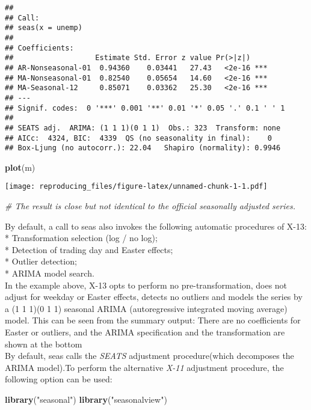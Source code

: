 \documentclass[]{article}
\newenvironment{Shaded}{\begin{snugshade}}{\end{snugshade}}
\newcommand{\CommentTok}[1]{\textcolor[rgb]{0.56,0.35,0.01}{\textit{#1}}}
\newcommand{\KeywordTok}[1]{\textcolor[rgb]{0.13,0.29,0.53}{\textbf{#1}}}
\newcommand{\NormalTok}[1]{#1}
\newcommand{\StringTok}[1]{\textcolor[rgb]{0.31,0.60,0.02}{#1}}
\begin{document}
\begin{verbatim}
## 
## Call:
## seas(x = unemp)
## 
## Coefficients:
##                   Estimate Std. Error z value Pr(>|z|)    
## AR-Nonseasonal-01  0.94360    0.03441   27.43   <2e-16 ***
## MA-Nonseasonal-01  0.82540    0.05654   14.60   <2e-16 ***
## MA-Seasonal-12     0.85071    0.03362   25.30   <2e-16 ***
## ---
## Signif. codes:  0 '***' 0.001 '**' 0.01 '*' 0.05 '.' 0.1 ' ' 1
## 
## SEATS adj.  ARIMA: (1 1 1)(0 1 1)  Obs.: 323  Transform: none
## AICc:  4324, BIC:  4339  QS (no seasonality in final):    0  
## Box-Ljung (no autocorr.): 22.04   Shapiro (normality): 0.9946
\end{verbatim}

\begin{Shaded}
\begin{Highlighting}[]
\KeywordTok{plot}\NormalTok{(m)}
\end{Highlighting}
\end{Shaded}

\texttt{[image: reproducing\_files/figure-latex/unnamed-chunk-1-1.pdf]}

\begin{Shaded}
\begin{Highlighting}[]
\CommentTok{# The result is close but not identical to the official seasonally adjusted series.}
\end{Highlighting}
\end{Shaded}

By default, a call to seas also invokes the following automatic
procedures of X-13: * Transformation selection (log / no log);\\
* Detection of trading day and Easter effects;\\
* Outlier detection;\\
* ARIMA model search.\\
In the example above, X-13 opts to perform no pre-transformation, does
not adjust for weekday or Easter effects, detects no outliers and models
the series by a (1 1 1)(0 1 1) seasonal ARIMA (autoregressive integrated
moving average) model. This can be seen from the summary output: There
are no coefficients for Easter or outliers, and the ARIMA specification
and the transformation are shown at the bottom\\
By default, seas calls the \emph{SEATS} adjustment procedure(which
decomposes the ARIMA model).To perform the alternative \emph{X-11}
adjustment procedure, the following option can be used:

\begin{Shaded}
\begin{Highlighting}[]
\KeywordTok{library}\NormalTok{(}\StringTok{"seasonal"}\NormalTok{)}
\KeywordTok{library}\NormalTok{(}\StringTok{"seasonalview"}\NormalTok{)}
\end{Highlighting}
\end{Shaded}
\end{document}
